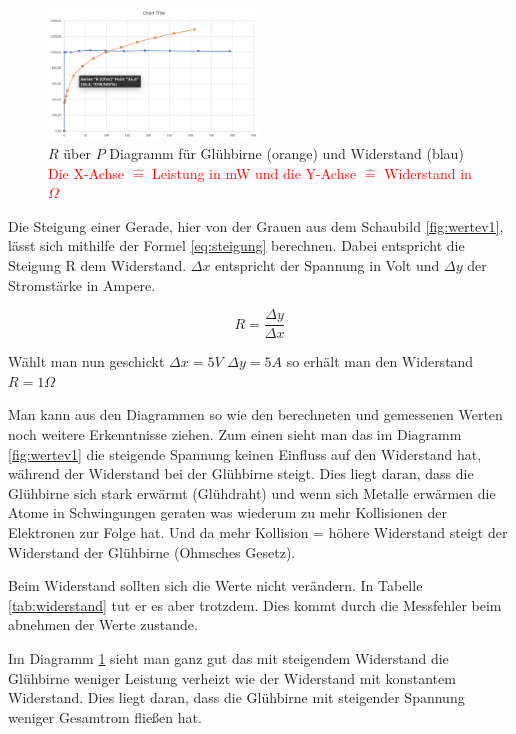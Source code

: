         \begin{figure}[H]
            \centering
            \includegraphics[width=0.5\textwidth]{bilder/Physik_03.png}
            \caption{$R$ über $P$ Diagramm für Glühbirne (orange) und Widerstand (blau)\\ \textcolor{red}{Die X-Achse $\hat{=}$ Leistung in mW und die Y-Achse $\hat{=}$ Widerstand in $\Omega$}}
            \label{fig:wertev2}
        \end{figure}

        Die Steigung einer Gerade, hier von der Grauen aus dem Schaubild \ref{fig:wertev1}, lässt sich mithilfe der Formel \ref{eq:steigung} berechnen. Dabei entspricht die Steigung R dem Widerstand. $\Delta x$ entspricht der Spannung in Volt und $\Delta y$ der Stromstärke in Ampere. 
      
        \begin{equation}
            R = \frac{\Delta y}{\Delta x}
            \label{eq:steigung}
        \end{equation}
     
        Wählt man nun geschickt $\Delta x= 5V$  $\Delta y=5A$ so erhält man den Widerstand $R = 1 \Omega$

        Man kann aus den Diagrammen so wie den berechneten und gemessenen Werten noch weitere Erkenntnisse ziehen. Zum einen sieht man das im Diagramm \ref{fig:wertev1} die steigende Spannung keinen Einfluss auf den Widerstand hat, während der Widerstand bei der Glühbirne steigt. Dies liegt daran, dass die Glühbirne sich stark erwärmt (Glühdraht) und wenn sich Metalle erwärmen die Atome in Schwingungen geraten was wiederum zu mehr Kollisionen der Elektronen zur Folge hat. Und da mehr Kollision = höhere Widerstand steigt der Widerstand der Glühbirne (Ohmsches Gesetz). 
        
        Beim Widerstand sollten sich die Werte nicht verändern. In Tabelle \ref{tab:widerstand} tut er es aber trotzdem. Dies kommt durch die Messfehler beim abnehmen der Werte zustande. 

        Im Diagramm \ref{fig:wertev2} sieht man ganz gut das mit steigendem Widerstand die Glühbirne weniger Leistung verheizt wie der Widerstand mit konstantem Widerstand. Dies liegt daran, dass die Glühbirne mit steigender Spannung weniger Gesamtrom fließen hat.

